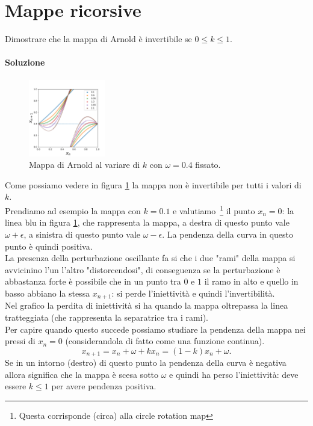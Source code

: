 \section{Mappe ricorsive}%
\begin{ex}
       Dimostrare che la mappa di Arnold è invertibile se $0\le k\le 1$.
\end{ex}
\noindent
\paragraph{Soluzione}%
       \begin{figure}[H]
           \centering
           \includegraphics[width=0.3\textwidth]{../figures/chap1/4_3_py.png}
	   \caption{\scriptsize Mappa di Arnold al variare di $k$ con $\omega  = 0.4$ fissato.}
           \label{fig:4_3_py-png}
       \end{figure}
       \noindent
       Come possiamo vedere in figura \ref{fig:4_3_py-png} la mappa non è invertibile per tutti i valori di $k$. \\
       Prendiamo ad esempio la mappa con $k=0.1$ e valutiamo\
       \footnote{Questa corrisponde (circa) alla circle rotation map} il punto $x_n=0$: la linea blu in figura \ref{fig:4_3_py-png}, che rappresenta la mappa, a destra di questo punto vale $\omega+\epsilon$, a sinistra di questo punto vale $\omega-\epsilon$. La pendenza della curva in questo punto è quindi positiva.\\
       La presenza della perturbazione oscillante fa si che i due "rami" della mappa si avvicinino l'un l'altro "distorcendosi", di conseguenza se la perturbazione è abbastanza forte è possibile che in un punto tra $0$ e $1$ il ramo in alto e quello in basso abbiano la stessa $x_{n+1}$: si perde l'iniettività e quindi l'invertibilità.\\
       Nel grafico la perdita di iniettività si ha quando la mappa oltrepassa la linea tratteggiata (che rappresenta la separatrice tra i rami).\\
       Per capire quando questo succede possiamo studiare la pendenza della mappa nei pressi di $x_n = 0$ (considerandola di fatto come una funzione continua).
       \[
	   x_{n+1} = x_n + \omega + k x_n = (1-k) x_n + \omega
       .\] 
       Se in un intorno (destro) di questo punto la pendenza della curva è negativa allora significa che la mappa è scesa sotto $\omega$ e quindi ha perso l'iniettività: deve essere $k\le 1$ per avere pendenza positiva.


